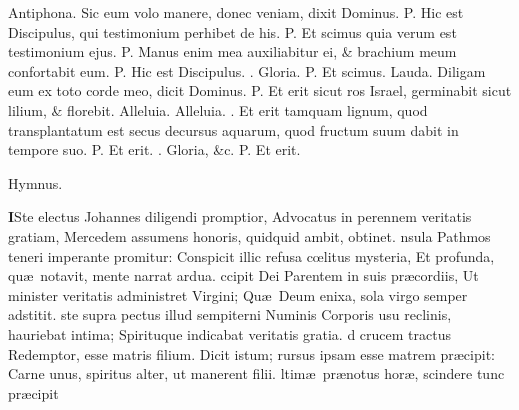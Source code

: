 \documentclass[letter,11pt]{book}
\makeatletter
\DeclareRobustCommand{\Vbar}{\vers@resp{-0.1em}{V}}
\newcommand{\vers@resp@sym}{\raisebox{0.2ex}{\rotatebox[origin=c]{-20}{$\m@th\rceil$}}}
\newcommand{\vers@resp}[2]{%
  {\ooalign{\hidewidth\kern#1\vers@resp@sym\hidewidth\cr#2\cr}}%
}%
\def\P{\color{Red} P. \color{black}}
\def\V{\color{Red} \Vbar . \color{black}}
\makeatother
\begin{document}
\begin{multicols*}{2}
\newline \color{Red} Antiphona. \color{black} Sic eum volo manere, donec veniam, dixit Dominus. \P Hic est Discipulus, qui testimonium perhibet de his. \P Et scimus quia verum est testimonium ejus. \P Manus enim mea auxiliabitur ei, \& brachium meum confortabit eum. \P Hic est Discipulus. \V Gloria. \P Et scimus.
\newline \color{Red} Lauda. \color{black} Diligam eum ex toto corde meo, dicit Dominus. \P Et erit sicut ros Israel, germinabit sicut lilium, \& florebit. Alleluia. Alleluia. \V Et erit tamquam lignum, quod transplantatum est secus decursus aquarum, quod fructum suum dabit in tempore suo. \P Et erit. \V Gloria, \&c. \P Et erit.
\vspace{-1.5em} \begin{center} \color{Red} Hymnus. \color{black} \end{center} \vspace{-.5em}
\lettrine[lines=2]{\bfseries \color{Red} I}{}Ste electus Johannes diligendi promptior,
\newline Advocatus in perennem veritatis gratiam,
\newline \indent Mercedem assumens honoris, quidquid ambit, obtinet.
nsula Pathmos teneri imperante promitur:
\newline \indent Conspicit illic refusa c\oe litus mysteria,
\newline \indent Et profunda, qu\ae \ notavit, mente narrat ardua.
ccipit Dei Parentem in suis pr\ae cordiis,
\newline \indent Ut minister veritatis administret Virgini;
\newline \indent Qu\ae \ Deum enixa, sola virgo semper adstitit.
ste supra pectus illud sempiterni Numinis
\newline \indent Corporis usu reclinis, hauriebat intima;
\newline \indent Spirituque indicabat veritatis gratia.
d crucem tractus Redemptor, esse matris filium.
\newline \indent Dicit istum; rursus ipsam esse matrem pr\ae cipit:
\newline \indent Carne unus, spiritus alter, ut manerent filii.
ltim\ae \ pr\ae notus hor\ae , scindere tunc pr\ae cipit

\end{multicols*}
\end{document}
